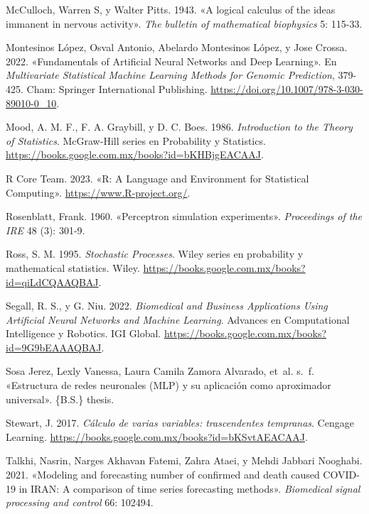 \documentclass[
  us-letterpaper,
]{scrreprt}
\newlength{\cslhangindent}
\newenvironment{CSLReferences}[2] %
 {\begin{list}{}{%
  \setlength{\itemindent}{0pt}
  \setlength{\leftmargin}{0pt}
  \setlength{\parsep}{0pt}
  \ifodd #1
   \setlength{\leftmargin}{\cslhangindent}
   \setlength{\itemindent}{-1\cslhangindent}
  \fi
  \setlength{\itemsep}{#2\baselineskip}}}
 {\end{list}}
\theoremstyle{plain}
\theoremstyle{definition}
\theoremstyle{definition}
\theoremstyle{plain}
\theoremstyle{remark}
\begin{document}
\begin{CSLReferences}{1}{0}
McCulloch, Warren S, y Walter Pitts. 1943. {«A logical calculus of the
ideas immanent in nervous activity»}. \emph{The bulletin of mathematical
biophysics} 5: 115-33.

Montesinos López, Osval Antonio, Abelardo Montesinos López, y Jose
Crossa. 2022. {«Fundamentals of Artificial Neural Networks and Deep
Learning»}. En \emph{Multivariate Statistical Machine Learning Methods
for Genomic Prediction}, 379-425. Cham: Springer International
Publishing. \url{https://doi.org/10.1007/978-3-030-89010-0_10}.

Mood, A. M. F., F. A. Graybill, y D. C. Boes. 1986. \emph{Introduction
to the Theory of Statistics}. McGraw-Hill series en Probability y
Statistics. \url{https://books.google.com.mx/books?id=bKHBjgEACAAJ}.

R Core Team. 2023. {«R: A Language and Environment for Statistical
Computing»}. \url{https://www.R-project.org/}.

Rosenblatt, Frank. 1960. {«Perceptron simulation experiments»}.
\emph{Proceedings of the IRE} 48 (3): 301-9.

Ross, S. M. 1995. \emph{Stochastic Processes}. Wiley series en
probability y mathematical statistics. Wiley.
\url{https://books.google.com.mx/books?id=qiLdCQAAQBAJ}.

Segall, R. S., y G. Niu. 2022. \emph{Biomedical and Business
Applications Using Artificial Neural Networks and Machine Learning}.
Advances en Computational Intelligence y Robotics. IGI Global.
\url{https://books.google.com.mx/books?id=9G9bEAAAQBAJ}.

Sosa Jerez, Lexly Vanessa, Laura Camila Zamora Alvarado, et~al. s.~f.
{«Estructura de redes neuronales (MLP) y su aplicaci{ó}n como
aproximador universal»}. \{B.S.\} thesis.

Stewart, J. 2017. \emph{C{á}lculo de varias variables: trascendentes
tempranas}. Cengage Learning.
\url{https://books.google.com.mx/books?id=bKSvtAEACAAJ}.

Talkhi, Nasrin, Narges Akhavan Fatemi, Zahra Ataei, y Mehdi Jabbari
Nooghabi. 2021. {«Modeling and forecasting number of confirmed and death
caused COVID-19 in IRAN: A comparison of time series forecasting
methods»}. \emph{Biomedical signal processing and control} 66: 102494.


\end{CSLReferences}
\end{document}
